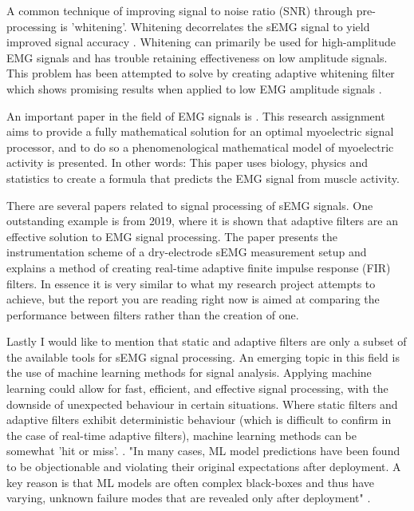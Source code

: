 A common technique of improving signal to noise ratio (SNR) through pre-processing is 'whitening'. Whitening decorrelates the sEMG signal to yield improved signal accuracy \cite{emg_whitening}. 
Whitening can primarily be used for high-amplitude EMG signals and has trouble retaining effectiveness on low amplitude signals. This problem has been attempted to solve by creating adaptive whitening filter which shows promising results when applied to low EMG amplitude signals \cite{adaptive_whitening}. 

An important paper in the field of EMG signals is \cite{optimal_myoprocessor}. This research assignment aims to provide a fully mathematical solution for an optimal myoelectric signal processor, and to do so a phenomenological mathematical model of myoelectric activity is presented. In other words: This paper uses biology, physics and statistics to create a formula that predicts the EMG signal from muscle activity.

There are several papers related to signal processing of sEMG signals.
One outstanding example is \cite{adaptive_filter_dry_electrode} from 2019, where it is shown that adaptive filters are an effective solution to EMG signal processing. The paper presents the instrumentation scheme of a dry-electrode sEMG measurement setup and explains a method of creating real-time adaptive finite impulse response (FIR) filters. In essence it is very similar to what my research project attempts to achieve, but the report you are reading right now is aimed at comparing the performance between filters rather than the creation of one.

Lastly I would like to mention that static and adaptive filters are only a subset of the available tools for sEMG signal processing. An emerging topic in this field is the use of machine learning methods for signal analysis. Applying machine learning could allow for fast, efficient, and effective signal processing, with the downside of unexpected behaviour in certain situations. Where static filters and adaptive filters exhibit deterministic behaviour (which is difficult to confirm in the case of real-time adaptive filters), machine learning methods can be somewhat 'hit or miss'. \cite{ml_semg_processing_1,ml_semg_processing_2}.
"In many cases, ML model predictions have been found to be objectionable and violating their original expectations after deployment. A key reason is that ML models are often complex black-boxes and thus have varying, unknown failure modes that are revealed only after deployment" \cite{microsoft_machine_learning_reliable}.


